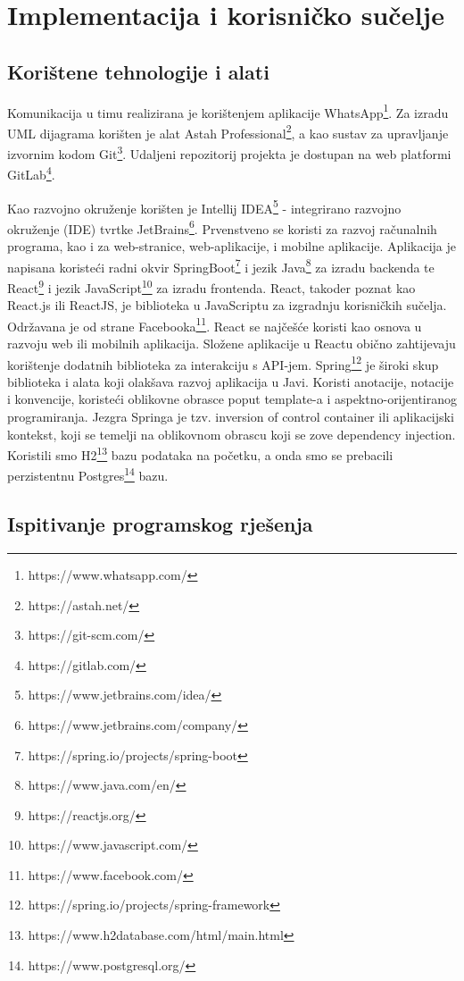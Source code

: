 \chapter{Implementacija i korisničko sučelje}
		
		
		\section{Korištene tehnologije i alati}
		
			Komunikacija u timu realizirana je korištenjem aplikacije WhatsApp\footnote{https://www.whatsapp.com/}. Za izradu UML dijagrama korišten je alat Astah Professional\footnote{https://astah.net/}, a kao sustav za upravljanje
			izvornim kodom Git\footnote{https://git-scm.com/}. Udaljeni repozitorij projekta je dostupan na web platformi GitLab\footnote{https://gitlab.com/}.\par
			
			Kao razvojno okruženje korišten je Intellij IDEA\footnote{https://www.jetbrains.com/idea/}
			- integrirano razvojno okruženje (IDE) tvrtke JetBrains\footnote{https://www.jetbrains.com/company/}. Prvenstveno se koristi za razvoj računalnih programa, kao i za web-stranice, web-aplikacije, i mobilne aplikacije. 
			Aplikacija je napisana koristeći radni okvir SpringBoot\footnote{https://spring.io/projects/spring-boot} i jezik Java\footnote{https://www.java.com/en/} za izradu backenda te React\footnote{https://reactjs.org/}
			i jezik JavaScript\footnote{https://www.javascript.com/} za izradu frontenda. React, takoder
			poznat kao React.js ili ReactJS, je biblioteka u JavaScriptu za izgradnju korisničkih sučelja. Održavana je od strane Facebooka\footnote{https://www.facebook.com/}. React se najčešće koristi kao osnova u razvoju web ili mobilnih aplikacija. Složene aplikacije u Reactu obično zahtijevaju korištenje dodatnih biblioteka za interakciju s API-jem. Spring\footnote{https://spring.io/projects/spring-framework} je široki skup biblioteka i alata koji olakšava razvoj aplikacija u Javi. Koristi anotacije, notacije i konvencije, koristeći oblikovne obrasce poput template-a i aspektno-orijentiranog programiranja.
			Jezgra Springa je tzv. inversion of control container ili aplikacijski kontekst, koji se temelji na oblikovnom obrascu koji se zove dependency injection.
			Koristili smo H2\footnote{https://www.h2database.com/html/main.html} bazu podataka na početku, a onda smo se prebacili perzistentnu Postgres\footnote{https://www.postgresql.org/} bazu.
		
	
		\section{Ispitivanje programskog rješenja}
			
